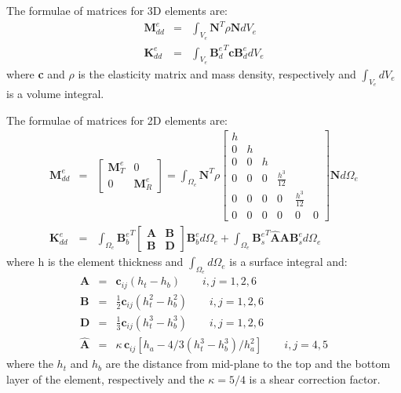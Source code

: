 \documentclass[materials,article,submit,moreauthors,pdftex]{Definitions/mdpi}
\begin{document}

\appendix
\section{}
\label{app:matrices}
The formulae of matrices for 3D elements are:
\begin{eqnarray}
\textbf{M}_{dd}^e & = & \int_{V_e}\textbf{N}^T\rho \textbf{N} dV_e\\
\textbf{K}_{dd}^e & = & \int_{V_e}{\textbf{B}_d^e}^T\textbf{c}\textbf{B}_d^edV_e
\end{eqnarray}
where \textbf{c} and \(\rho\) is the elasticity matrix and mass density, respectively and \(\int_{V_e}dV_e\) is a volume integral.

The formulae of matrices for 2D elements are:
\begin{eqnarray}
\textbf{M}_{dd}^e & = &
\left [
\begin{array}{cc}
\textbf{M}_T^e & 0\\
0 & \textbf{M}_R^e
\end{array}
\right] =
\int_{\Omega_e}\textbf{N}^T\rho 
\left [
\begin{array}{cccccc}
h &  & &  &  &\\
0 & h & & & &\\
0 & 0 & h & & & \\
0 & 0 & 0 & \frac{h^3}{12} & &\\
0 & 0 & 0 & 0 & \frac{h^3}{12} &\\
0 & 0 & 0 & 0 & 0 & 0
\end{array} \right]
\textbf{N} d\Omega_e\\
\textbf{K}_{dd}^e & = & \int_{\Omega_e}{\textbf{B}_b^e}^T
\left[
\begin{array}{cc}
\textbf{A} & \textbf{B}\\
\textbf{B} & \textbf{D}
\end{array} \right]
\textbf{B}_b^ed \Omega_e+\int_{\Omega_e}{\textbf{B}_s^e}^T\hat{\textbf{A}}\textbf{A}\textbf{B}_s^ed \Omega_e
\end{eqnarray}
where h is the element thickness and \(\int_{\Omega_e}d\Omega_e\) is a surface integral and:
\begin{eqnarray}
\textbf{A} & = & \textbf{c}_{ij}(h_t-h_b)\qquad i,j=1,2,6\nonumber\\
\textbf{B} & = & \frac{1}{2}\textbf{c}_{ij}(h_t^2-h_b^2)\qquad i,j=1,2,6\nonumber\\
\textbf{D} & = & \frac{1}{3}\textbf{c}_{ij}(h_t^3-h_b^3)\qquad i,j=1,2,6\nonumber\\
\hat{\textbf{A}} & = & \kappa \, \textbf{c}_{ij}\left[h_a-4/3\left(h_t^3-h_b^3\right)/h_a^2\right]\qquad i,j=4,5\nonumber
\end{eqnarray}
where the \(h_t\) and \(h_b\) are the distance from mid-plane to the top and the bottom layer of the element, respectively and the \(\kappa=5/4\) is a shear correction factor.
\end{document}
